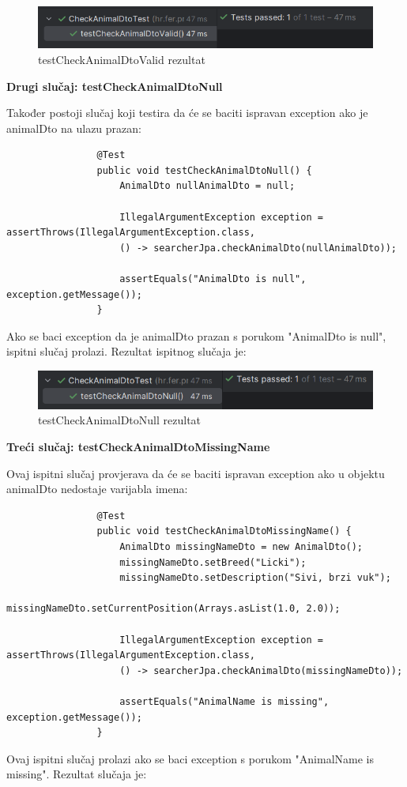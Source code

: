			\begin{figure}[H]
				\includegraphics[scale=0.8]{slike/testCheckAnimalDtoValid.PNG} 
				\centering
				\caption{testCheckAnimalDtoValid rezultat}
				\label{fig:testCheckAnimalDtoValid}
			\end{figure}
			
			\noindent\textbf{Drugi slučaj: testCheckAnimalDtoNull}
			
			Također postoji slučaj koji testira da će se baciti ispravan exception ako je animalDto na ulazu prazan:
			\begin{lstlisting}
				@Test
				public void testCheckAnimalDtoNull() {
					AnimalDto nullAnimalDto = null;
					
					IllegalArgumentException exception = assertThrows(IllegalArgumentException.class,
					() -> searcherJpa.checkAnimalDto(nullAnimalDto));
					
					assertEquals("AnimalDto is null", exception.getMessage());
				}
			\end{lstlisting}
			Ako se baci exception da je animalDto prazan s porukom "AnimalDto is null", ispitni slučaj prolazi. Rezultat ispitnog slučaja je:
			
			\begin{figure}[H]
				\includegraphics[scale=0.8]{slike/testCheckAnimalDtoNull.PNG} 
				\centering
				\caption{testCheckAnimalDtoNull rezultat}
				\label{fig:testCheckAnimalDtoNull}
			\end{figure}
			
			\noindent\textbf{Treći slučaj: testCheckAnimalDtoMissingName}
			
			Ovaj ispitni slučaj provjerava da će se baciti ispravan exception ako u objektu animalDto nedostaje varijabla imena:
			\begin{lstlisting}
				@Test
				public void testCheckAnimalDtoMissingName() {
					AnimalDto missingNameDto = new AnimalDto();
					missingNameDto.setBreed("Licki");
					missingNameDto.setDescription("Sivi, brzi vuk");
					missingNameDto.setCurrentPosition(Arrays.asList(1.0, 2.0));
					
					IllegalArgumentException exception = assertThrows(IllegalArgumentException.class,
					() -> searcherJpa.checkAnimalDto(missingNameDto));
					
					assertEquals("AnimalName is missing", exception.getMessage());
				}
			\end{lstlisting}
			Ovaj ispitni slučaj prolazi ako se baci exception s porukom "AnimalName is missing". Rezultat slučaja je:
			
